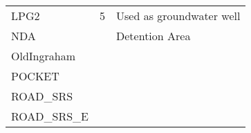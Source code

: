 \begin{table}[!h]
\begin{tabular}{lcl}
LPG2               & 5            & Used as groundwater well                    \\
NDA                &              & Detention Area                              \\
OldIngraham        &              &                                             \\
POCKET             &              &                                             \\
ROAD\_SRS          &              &                                             \\
ROAD\_SRS\_E       &              &                                             \\
\hline
\end{tabular}
\end{table}

\clearpage

